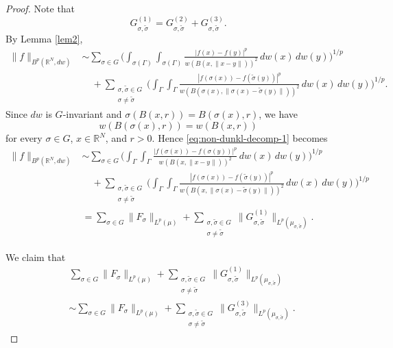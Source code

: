 \documentclass[12pt]{amsart}
\begin{document}
\begin{proof}
Note that
\[
G_{\sigma,\tilde{\sigma}}^{(1)}
=
G_{\sigma,\tilde{\sigma}}^{(2)}
+
G_{\sigma,\tilde{\sigma}}^{(3)}.
\]
By Lemma \ref{lem2},
\begin{align}
\|f\|_{B^p(\mathbb R^N,dw)}
&\sim
\sum_{\sigma\in G}
\Bigg(
\int_{\sigma(\Gamma)}\int_{\sigma(\Gamma)}
\frac{|f(x)-f(y)|^p}{w(B(x,\|x-y\|))^2}\,dw(x)\,dw(y)
\Bigg)^{1/p}
\nonumber\\
&\quad+
\sum_{\substack{\sigma,\tilde{\sigma}\in G\\ \sigma\neq \tilde{\sigma}}}
\Bigg(
\int_{\Gamma}\int_{\Gamma}
\frac{|f(\sigma(x))-f(\tilde{\sigma}(y))|^p}
{w(B(\sigma(x),\|\sigma(x)-\tilde{\sigma}(y)\|))^2}
\,dw(x)\,dw(y)
\Bigg)^{1/p}.
\label{eq:non-dunkl-decomp-1}
\end{align}
Since \(dw\) is \(G\)-invariant and \(\sigma(B(x,r))=B(\sigma(x),r)\), we have
\[
w(B(\sigma(x),r))=w(B(x,r))
\]
for every \(\sigma\in G\), \(x\in\mathbb R^N\), and \(r>0\). Hence \eqref{eq:non-dunkl-decomp-1} becomes
\begin{align}
\|f\|_{B^p(\mathbb R^N,dw)}
&\sim
\sum_{\sigma\in G}
\Bigg(
\int_{\Gamma}\int_{\Gamma}
\frac{|f(\sigma(x))-f(\sigma(y))|^p}{w(B(x,\|x-y\|))^2}
\,dw(x)\,dw(y)
\Bigg)^{1/p}
\nonumber\\
&\quad+
\sum_{\substack{\sigma,\tilde{\sigma}\in G\\ \sigma\neq \tilde{\sigma}}}
\Bigg(
\int_{\Gamma}\int_{\Gamma}
\frac{|f(\sigma(x))-f(\tilde{\sigma}(y))|^p}
{w(B(x,\|\sigma(x)-\tilde{\sigma}(y)\|))^2}
\,dw(x)\,dw(y)
\Bigg)^{1/p}
\nonumber\\
&=
\sum_{\sigma\in G}\|F_\sigma\|_{L^p(\mu)}
+
\sum_{\substack{\sigma,\tilde{\sigma}\in G\\ \sigma\neq \tilde{\sigma}}}
\|G_{\sigma,\tilde{\sigma}}^{(1)}\|_{L^p(\mu_{\sigma,\tilde{\sigma}})}.
\label{eq:non-dunkl-decomp-2}
\end{align}

We claim that
\begin{align}
&\sum_{\sigma\in G}\|F_\sigma\|_{L^p(\mu)}
+
\sum_{\substack{\sigma,\tilde{\sigma}\in G\\ \sigma\neq \tilde{\sigma}}}
\|G_{\sigma,\tilde{\sigma}}^{(1)}\|_{L^p(\mu_{\sigma,\tilde{\sigma}})}
\nonumber\\
&\sim
\sum_{\sigma\in G}\|F_\sigma\|_{L^p(\mu)}
+
\sum_{\substack{\sigma,\tilde{\sigma}\in G\\ \sigma\neq \tilde{\sigma}}}
\|G_{\sigma,\tilde{\sigma}}^{(3)}\|_{L^p(\mu_{\sigma,\tilde{\sigma}})}.
\label{eq:claim-non-dunkl}
\end{align}


\end{proof}
\end{document}
